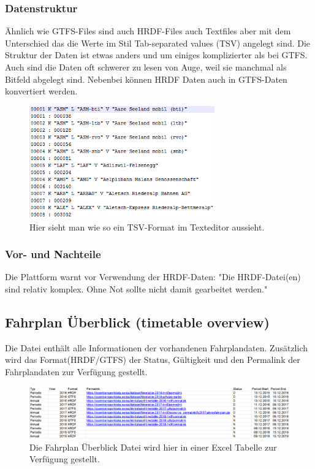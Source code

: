 \documentclass[a4paper,12pt]{scrartcl}
\begin{document}
\subsubsection{Datenstruktur}
\label{sec:hrdf-datenstrukur}
Ähnlich wie GTFS-Files sind auch HRDF-Files auch Textfiles aber mit dem Unterschied das die Werte im Stil Tab-separated values (TSV) angelegt sind. Die Struktur der Daten ist etwas anders und um einiges komplizierter als bei GTFS. Auch sind die Daten oft schwerer zu lesen von Auge, weil sie manchmal als Bitfeld abgelegt sind. Nebenbei können HRDF Daten auch in GTFS-Daten konvertiert werden.\cite{hrdfintogtfs}
\begin{figure}[]
	\centering
	\includegraphics[width=8cm]{img/bsptsv.png}
	\caption{Hier sieht man wie so ein TSV-Format im Texteditor aussieht.}
	\label{fig:hrdf-dateiformat}
\end{figure}


\subsubsection{Vor- und Nachteile}	
\label{sec:hrdf-vornachteile}
Die Plattform warnt vor Verwendung der HRDF-Daten: "Die HRDF-Datei(en) sind relativ komplex. Ohne Not sollte nicht damit gearbeitet werden."\cite{opentransporthrdf}

\subsection{Fahrplan Überblick (timetable overview)}
\label{sec:Fahrplan Ueberblick}
Die Datei enthält alle Informationen der vorhandenen Fahrplandaten. Zusätzlich wird das Format(HRDF/GTFS) der Status, Gültigkeit und den Permalink der Fahrplandaten zur Verfügung gestellt.

\begin{figure}[]
	\centering
	\includegraphics[width=12cm]{img/fahrplanueberblick.png}
	\caption{Die Fahrplan Überblick Datei wird hier in einer Excel Tabelle zur Verfügung gestellt.}
	\label{fig:Fahrplan Ueberblick dateiformat}
\end{figure}
\end{document}
